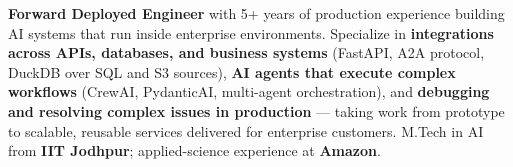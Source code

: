 \documentclass[letter,10pt]{article}
\begin{document}

\textbf{Forward Deployed Engineer} with 5+ years of production experience building AI systems that run inside enterprise environments.
Specialize in \textbf{integrations across APIs, databases, and business systems} (FastAPI, A2A protocol, DuckDB over SQL and S3 sources), \textbf{AI agents that execute complex workflows} (CrewAI, PydanticAI, multi-agent orchestration), and \textbf{debugging and resolving complex issues in production} — taking work from prototype to scalable, reusable services delivered for enterprise customers.
M.Tech in AI from \textbf{IIT Jodhpur}; applied-science experience at \textbf{Amazon}.
\end{document}

